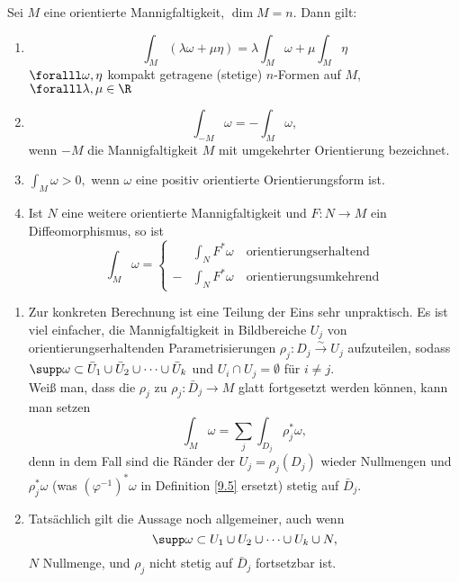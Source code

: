 \begin{lem}\autolabel
	Sei $M$ eine orientierte Mannigfaltigkeit, $\dim M = n$. Dann gilt:
	\begin{enumerate}[label={\roman*})]
		\item \[ \int_M (\lambda\omega + \mu \eta) = \lambda \int_M \omega + \mu \int_M \eta \]
			\( \foralll \omega,\eta \) kompakt getragene (stetige) $n$-Formen auf $M$, $\foralll \lambda, \mu \in \R$
		\item \[ \int_{-M} \omega = -\int_M \omega, \]
			wenn $-M$ die Mannigfaltigkeit $M$ mit umgekehrter Orientierung bezeichnet.
		\item \( \int_M \omega > 0, \) wenn $\omega$ eine positiv orientierte Orientierungsform ist.
		\item Ist $N$ eine weitere orientierte Mannigfaltigkeit und \( F: N \to M \) ein Diffeomorphismus, so ist
			\[ \int_M \omega = \begin{cases}
				&\int_N F^*\omega\quad \text{orientierungserhaltend} \\ -&\int_N F^*\omega\quad \text{orientierungsumkehrend}
			\end{cases} \]
	\end{enumerate}
\end{lem}

\begin{rem}\autolabel
	\begin{enumerate}[label={\roman*})]
		\item Zur konkreten Berechnung ist eine Teilung der Eins sehr unpraktisch. Es ist viel einfacher, die Mannigfaltigkeit in Bildbereiche $U_j$ von orientierungserhaltenden Parametrisierungen \( \rho_j: D_j \overset{\sim}{\longrightarrow} U_j \) aufzuteilen, sodass \( \supp \omega \subset \bar{U}_1 \cup \bar{U}_2 \cup \dots \cup \bar{U}_k \) und \( U_i \cap U_j = \emptyset \) für $i \neq j$.\\
			 Weiß man, dass die $\rho_j$ zu $\rho_j: \bar{D}_j \to M$ glatt fortgesetzt werden können, kann man setzen 
			 \[ \int_M \omega = \sum_j \int_{D_j} \rho_j^* \omega, \]
			 denn in dem Fall sind die Ränder der \( U_j = \rho_j(D_j) \) wieder Nullmengen und \( \rho_j^*\omega \) (was \( (\varphi^{-1})^*\omega\) in Definition \ref{9.5} ersetzt) stetig auf \( \bar{D}_j \).
		\item Tatsächlich gilt die Aussage noch allgemeiner, auch wenn 
			\[ \supp\omega \subset U_1 \cup U_2 \cup \dots \cup U_k \cup N, \]
			$N$ Nullmenge, und \( \rho_j \) nicht stetig auf \( \bar{D}_j \) fortsetzbar ist.
	\end{enumerate}
\end{rem}

